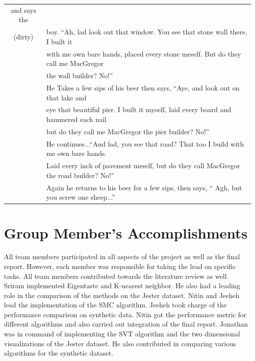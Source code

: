 \documentclass{article} %
\begin{document}
\begin{table} [h]
\begin{tabular}{c | l}
       and says the \\
(dirty)&  boy. ``Ah, lad look out that window. You see that stone wall
       there, I built it \\
     & with me own bare hands, placed every stone meself. But do they
       call me MacGregor \\
     & the wall builder? No!'' \\
     & He Takes a few sips of his beer then says, ``Aye, and look out
       on that lake and \\
     & eye that beautiful pier. I built it myself, laid every board
       and hammered each nail \\
     & but do they call me MacGregor the pier builder? No!'' \\
     & He continues...``And lad, you see that road? That too I build with me
       own bare hands. \\
     & Laid every inch of pavement meself, but do they
       call MacGregor the road builder? No!''\\
     & Again he returns to his beer for a few sips, then says,
       `` Agh, but you screw  one sheep...''\\
\hline \hline
\end{tabular}
\label{joketexts}
\end{table}
\FloatBarrier


\section{Group Member's Accomplishments}

All team members participated in all aspects of the project as well as
the final report. However, each member was responsible for taking the
lead on specific tasks. All team members contributed towards the
literature review as well. Sriram implemented Eigentaste and K-nearest
neighbor. He also had a leading role in the comparison of the methods
on the Jester dataset. Nitin and Jeeheh lead the implementation of the
SMC algorithm. Jeeheh took charge of the performance comparison on
synthetic data. Nitin got the performance metric for different
algorithms and also carried out integration of the final report.
Jonathan was in command of implementing the SVT algorithm and the two
dimensional visualizations of the Jester dataset. He also contributed
in comparing various algorithms for the synthetic dataset.


\newpage




\end{document}
